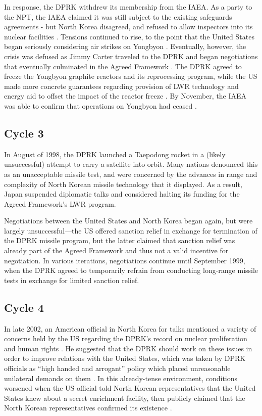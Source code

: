 In response, the DPRK withdrew its membership from the IAEA. As a party to the NPT, the IAEA claimed it was still subject to the existing safeguards agreements - but North Korea disagreed, and refused to allow inspectors into its nuclear facilities \cite{iaea09}. Tensions continued to rise, to the point that the United States began seriously considering air strikes on Yongbyon \cite{jun}. Eventually, however, the crisis was defused as Jimmy Carter traveled to the DPRK and began negotiations that eventually culminated in the Agreed Framework \cite{nti15}. The DPRK agreed to freeze the Yongbyon graphite reactors and its reprocessing program, while the US made more concrete guarantees regarding provision of LWR technology and energy aid to offset the impact of the reactor freeze \cite{agreed}. By November, the IAEA was able to confirm that operations on Yongbyon had ceased \cite{davenport}.

\subsection{Cycle 3}

In August of 1998, the DPRK launched a Taepodong rocket in a (likely unsuccessful) attempt to carry a satellite into orbit\cite{orfall}. Many nations denounced this as an unacceptable missile test, and were concerned by the advances in range and complexity of North Korean missile technology that it displayed\cite{orfall}. As a result, Japan suspended diplomatic talks and considered halting its funding for the Agreed Framework's LWR program\cite{orfall}.

Negotiations between the United States and North Korea began again, but were largely unsuccessful---the US offered sanction relief in exchange for termination of the DPRK missile program, but the latter claimed that sanction relief was already part of the Agreed Framework and thus not a valid incentive for negotiation\cite{davenport}. In various iterations, negotiations continue until September 1999, when the DPRK agreed to temporarily refrain from conducting long-range missile tests in exchange for limited sanction relief\cite{davenport}.

\subsection{Cycle 4}

In late 2002, an American official in North Korea for talks mentioned a variety of concerns held by the US regarding the DPRK's record on nuclear proliferation and human rights \cite{davenport}. He suggested that the DPRK should work on these issues in order to improve relations with the United States, which was taken by DPRK officials as “high handed and arrogant” policy which placed unreasonable unilateral demands on them \cite{kcna3}. In this already-tense environment, conditions worsened when the US official told North Korean representatives that the United States knew about a secret enrichment facility, then publicly claimed that the North Korean representatives confirmed its existence \cite{davenport}. 

